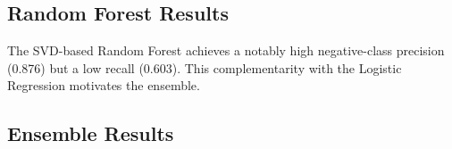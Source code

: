 \documentclass[11pt,a4paper]{article}
\begin{document}
\subsection{Random Forest Results}

\begin{table}[H]
  \centering
  \caption{Random Forest results. All trained on SVD-reduced features.}
  \label{tab:rf}
\end{table}

The SVD-based Random Forest achieves a notably high negative-class precision
(0.876) but a low recall (0.603).
This complementarity with the Logistic Regression motivates the ensemble.

\subsection{Ensemble Results}
\end{document}
